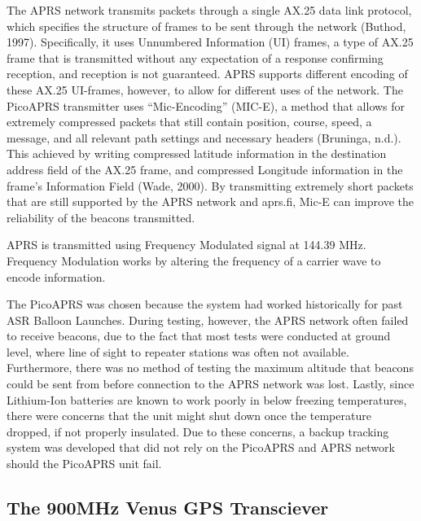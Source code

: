\documentclass[12pt,]{article}
\begin{document}
The APRS network transmits packets through a single AX.25 data link
protocol, which specifies the structure of frames to be sent through the
network (Buthod, 1997). Specifically, it uses Unnumbered Information
(UI) frames, a type of AX.25 frame that is transmitted without any
expectation of a response confirming reception, and reception is not
guaranteed. APRS supports different encoding of these AX.25 UI-frames,
however, to allow for different uses of the network. The PicoAPRS
transmitter uses ``Mic-Encoding'' (MIC-E), a method that allows for
extremely compressed packets that still contain position, course, speed,
a message, and all relevant path settings and necessary headers
(Bruninga, n.d.). This achieved by writing compressed latitude
information in the destination address field of the AX.25 frame, and
compressed Longitude information in the frame's Information Field (Wade,
2000). By transmitting extremely short packets that are still supported
by the APRS network and aprs.fi, Mic-E can improve the reliability of
the beacons transmitted.

APRS is transmitted using Frequency Modulated signal at 144.39 MHz.
Frequency Modulation works by altering the frequency of a carrier wave
to encode information.

The PicoAPRS was chosen because the system had worked historically for
past ASR Balloon Launches. During testing, however, the APRS network
often failed to receive beacons, due to the fact that most tests were
conducted at ground level, where line of sight to repeater stations was
often not available. Furthermore, there was no method of testing the
maximum altitude that beacons could be sent from before connection to
the APRS network was lost. Lastly, since Lithium-Ion batteries are known
to work poorly in below freezing temperatures, there were concerns that
the unit might shut down once the temperature dropped, if not properly
insulated. Due to these concerns, a backup tracking system was developed
that did not rely on the PicoAPRS and APRS network should the PicoAPRS
unit fail.

\subsection{The 900MHz Venus GPS
Transciever}\label{the-900mhz-venus-gps-transciever}
\end{document}
